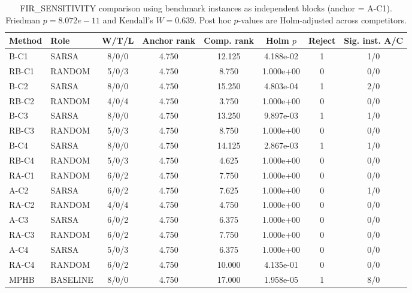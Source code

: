 \begin{table}[!t]
\centering
\footnotesize
\caption{FIR\_SENSITIVITY comparison using benchmark instances as independent blocks (anchor = A-C1). Friedman $p=8.072e-11$ and Kendall's $W=0.639$. Post hoc $p$-values are Holm-adjusted across competitors.}
\begin{tabular}{llcccccc}
\hline
Method & Role & W/T/L & Anchor rank & Comp. rank & Holm $p$ & Reject & Sig. inst. A/C \\
\hline
B-C1 & SARSA & 8/0/0 & 4.750 & 12.125 & 4.188e-02 & 1 & 1/0 \\
RB-C1 & RANDOM & 5/0/3 & 4.750 & 8.750 & 1.000e+00 & 0 & 0/0 \\
B-C2 & SARSA & 8/0/0 & 4.750 & 15.250 & 4.803e-04 & 1 & 2/0 \\
RB-C2 & RANDOM & 4/0/4 & 4.750 & 3.750 & 1.000e+00 & 0 & 0/0 \\
B-C3 & SARSA & 8/0/0 & 4.750 & 13.250 & 9.897e-03 & 1 & 1/0 \\
RB-C3 & RANDOM & 5/0/3 & 4.750 & 8.750 & 1.000e+00 & 0 & 0/0 \\
B-C4 & SARSA & 8/0/0 & 4.750 & 14.125 & 2.867e-03 & 1 & 1/0 \\
RB-C4 & RANDOM & 5/0/3 & 4.750 & 4.625 & 1.000e+00 & 0 & 0/0 \\
RA-C1 & RANDOM & 6/0/2 & 4.750 & 7.750 & 1.000e+00 & 0 & 0/0 \\
A-C2 & SARSA & 6/0/2 & 4.750 & 7.625 & 1.000e+00 & 0 & 1/0 \\
RA-C2 & RANDOM & 4/0/4 & 4.750 & 4.750 & 1.000e+00 & 0 & 0/0 \\
A-C3 & SARSA & 6/0/2 & 4.750 & 6.375 & 1.000e+00 & 0 & 0/0 \\
RA-C3 & RANDOM & 6/0/2 & 4.750 & 7.750 & 1.000e+00 & 0 & 0/0 \\
A-C4 & SARSA & 5/0/3 & 4.750 & 6.375 & 1.000e+00 & 0 & 0/0 \\
RA-C4 & RANDOM & 6/0/2 & 4.750 & 10.000 & 4.135e-01 & 0 & 0/0 \\
MPHB & BASELINE & 8/0/0 & 4.750 & 17.000 & 1.958e-05 & 1 & 8/0 \\
\hline
\end{tabular}
\end{table}
